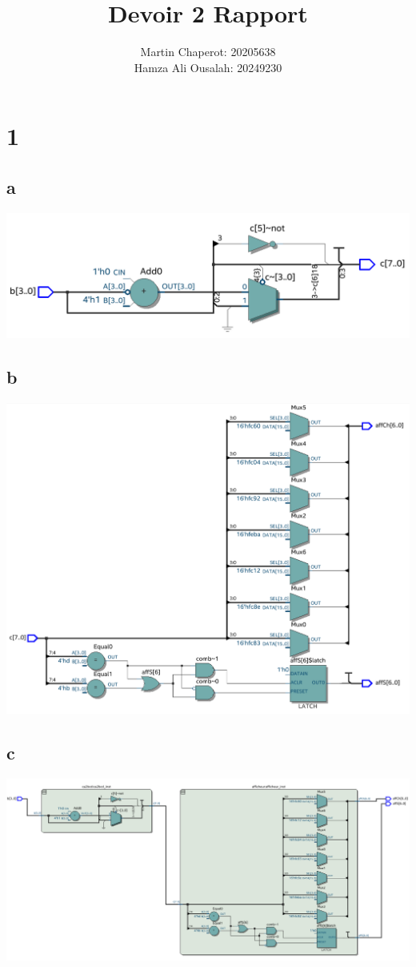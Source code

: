 \documentclass{article}
\title{Devoir 2 Rapport}
\author{Martin Chaperot: 20205638\\ Hamza Ali Ousalah: 20249230}
\date{}
\begin{document}
\maketitle

\section*{1}
\subsection*{a}
\includegraphics*[width=\textwidth]{q1a}
\subsection*{b}
\includegraphics*[width=\textwidth]{q1b}
\subsection*{c}
\includegraphics*[width=\textwidth]{q1c}
\end{document}
